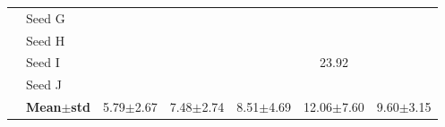 \begin{table}[H]
{\begin{tabular}{@{}llccccc@{}}
  & Seed G & \cellcolor{RoyalBlue!10}{\small 5.65} & \cellcolor{RoyalBlue!10}{\small 4.56} & \cellcolor{RoyalBlue!10}{\small 6.27} & \cellcolor{RoyalBlue!10}{\small 7.84} & \cellcolor{RoyalBlue!10}{\small 7.98} \\
  & Seed H & \cellcolor{RoyalBlue!10}{\small 4.37} & \cellcolor{RoyalBlue!10}{\small 5.22} & \cellcolor{RoyalBlue!10}{\small 6.21} & \cellcolor{RoyalBlue!10}{\small 7.10} & \cellcolor{RoyalBlue!10}{\small 7.64} \\
  & Seed I & \cellcolor{RoyalBlue!10}{\small 3.22} & \cellcolor{RoyalBlue!10}{\small 4.53} & \cellcolor{RoyalBlue!10}{\small 6.03} & {\small\color{gray!60!black}23.92} & \cellcolor{RoyalBlue!10}{\small 7.02} \\
  & Seed J & \cellcolor{RoyalBlue!10}{\small 4.06} & \cellcolor{RoyalBlue!10}{\small 10.19} & \cellcolor{RoyalBlue!10}{\small 6.09} & \cellcolor{RoyalBlue!10}{\small 8.46} & \cellcolor{RoyalBlue!10}{\small 8.64} \\
 & \textbf{Mean$\pm$std} & \cellcolor{RoyalBlue!20}5.79$\pm$2.67 & \cellcolor{RoyalBlue!20}7.48$\pm$2.74 & \cellcolor{RoyalBlue!20}8.51$\pm$4.69 & \cellcolor{RoyalBlue!20}12.06$\pm$7.60 & \cellcolor{RoyalBlue!20}9.60$\pm$3.15 \\
\bottomrule
\end{tabular}
}
\end{table}

